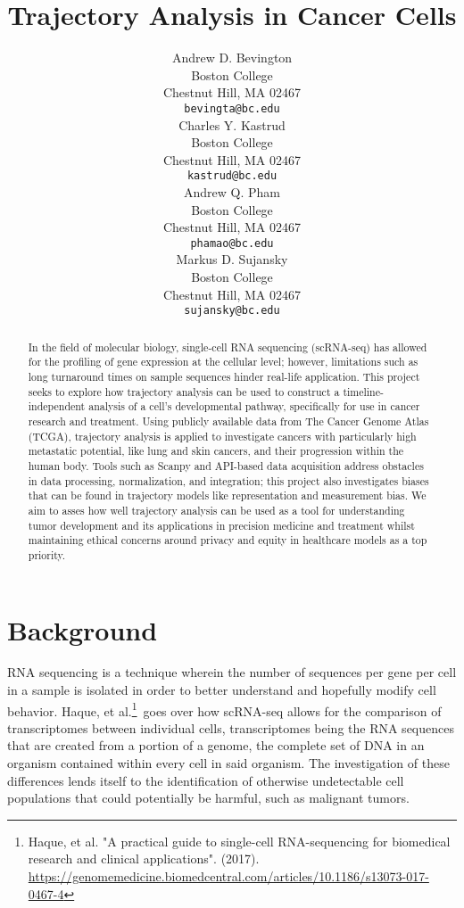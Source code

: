 \documentclass{article}
\title{Trajectory Analysis in Cancer Cells}
\author{%
  Andrew D. Bevington \\
  Boston College\\
  Chestnut Hill, MA 02467\\
  \texttt{bevingta@bc.edu} \\
  \And
  Charles Y. Kastrud \\
  Boston College\\
  Chestnut Hill, MA 02467\\
  \texttt{kastrud@bc.edu} \\
  \And
  Andrew Q. Pham \\
  Boston College\\
  Chestnut Hill, MA 02467\\
  \texttt{phamao@bc.edu} \\
  \And
  Markus D. Sujansky \\
  Boston College\\
  Chestnut Hill, MA 02467\\
  \texttt{sujansky@bc.edu} \\
}
\begin{document}
\maketitle


\begin{abstract}
  In the field of molecular biology, single-cell RNA sequencing (scRNA-seq) has allowed for the profiling of gene expression at the cellular level; however, limitations such as long turnaround times on sample sequences hinder real-life application. This project seeks to explore how trajectory analysis can be used to construct a timeline-independent analysis of a cell's developmental pathway, specifically for use in cancer research and treatment. Using publicly available data from The Cancer Genome Atlas (TCGA), trajectory analysis is applied to investigate cancers with particularly high metastatic potential, like lung and skin cancers, and their progression within the human body. Tools such as Scanpy and API-based data acquisition address obstacles in data processing, normalization, and integration; this project also investigates biases that can be found in trajectory models like representation and measurement bias. We aim to asses how well trajectory analysis can be used as a tool for understanding tumor development and its applications in precision medicine and treatment whilst maintaining ethical concerns around privacy and equity in healthcare models as a top priority.
  
\end{abstract}


\section{Background}
RNA sequencing is a technique wherein the number of sequences per gene per cell in a sample is isolated in order to better understand and hopefully modify cell behavior. Haque, et al.\footnote{Haque, et al. "A practical guide to single-cell RNA-sequencing for biomedical research and clinical applications". (2017). \url{https://genomemedicine.biomedcentral.com/articles/10.1186/s13073-017-0467-4}}\ goes over how scRNA-seq allows for the comparison of transcriptomes between individual cells, transcriptomes being the RNA sequences that are created from a portion of a genome, the complete set of DNA in an organism contained within every cell in said organism. The investigation of these differences lends itself to the identification of otherwise undetectable cell populations that could potentially be harmful, such as malignant tumors.
\end{document}
